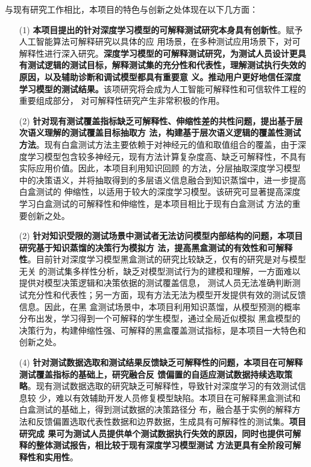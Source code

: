 与现有研究工作相比，本项目的特色与创新之处体现在以下几方面：

\begin{itemize}
    \item[(1)] \textbf{本项目提出的针对深度学习模型的可解释测试研究本身具有创新性}。赋予人工智能算法可解释研究以具体的应
          用场景，在多种测试应用场景下，对可解释性进行深入研究。\textbf{深度学习模型的可解释测试研究，为测试人员设计更具
              有测试逻辑的测试目标，解释测试集的充分性和代表性，理解测试执行失效的原因，以及辅助诊断和调试模型都具有重要意
              义。推动用户更好地信任深度学习模型的测试结果。}该项研究将会成为人工智能可解释性和可信软件工程的重要组成部分，
          对可解释性研究产生非常积极的作用。
    \item[(2)] \textbf{针对现有测试覆盖指标缺乏可解释性、伸缩性差的共性问题，提出基于层次语义理解的测试覆盖目标抽取方
              法，构建基于层次语义逻辑的覆盖性测试方法}。现有白盒测试方法主要依赖于对神经元的值和取值组合的覆盖，由于深
          度学习模型包含较多神经元，现有方法计算复杂度高、缺乏可解释性，不具有实际应用价值。因此，本项目利用知识回顾
          的方法，分层抽取深度学习模型中的决策语义，并将抽取得到的多层语义信息融合到知识蒸馏中，进一步提高白盒测试的
          伸缩性，以适用于较大的深度学习模型。该研究可显著提高深度学习白盒测试的可解释性和伸缩性，是本项目相比于现有白盒测试
          方法的重要创新之处。
    \item[(2)] \textbf{针对知识受限的测试场景中测试者无法访问模型内部结构的问题，本项目研究基于知识蒸馏的决策行为模拟方
              法，提高黑盒测试的有效性和可解释性}。目前针对深度学习模型黑盒测试的研究比较缺乏，仅有的研究是对与模型无关
          的测试集多样性分析，缺乏对模型测试行为的建模和理解，一方面难以提供对模型决策逻辑和决策依据的测试覆盖信息，
          测试人员无法准确判断测试充分性和代表性；另一方面，现有方法无法为模型开发提供有效的测试反馈信息。因此，在黑
          盒测试场景中，本项目利用知识蒸馏，从模型预测的概率分布出发，学习得到一个可解释的学生模型，通过全局近似模拟
          黑盒模型的决策行为，构建伸缩性强、可解释的黑盒覆盖测试指标，是本项目一大特色和创新之处。

    \item[(4)] \textbf{针对测试数据选取和测试结果反馈缺乏可解释性的问题，本项目在可解释测试覆盖指标的基础上，研究融合反
              馈偏置的自适应测试数据持续选取策略}。现有测试数据选取的研究缺乏可解释性，导致针对深度学习的有效测试信息较
          少，难以有效辅助开发人员修复模型缺陷。本项目在可解释黑盒测试和白盒测试的基础上，得到测试数据的决策路径分
          布，融合基于实例的解释方法和反馈偏置选取代表性数据和边界数据，生成具有可解释性的测试集。\textbf{项目研究成
              果可为测试人员提供单个测试数据执行失效的原因，同时也提供可解释的整体测试报告，相比较于现有深度学习模型测试
              方法更具有全阶段可解释性和实用性}。
\end{itemize}